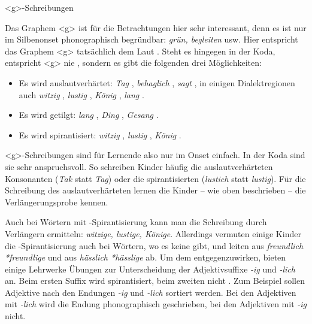\begin{Exkurs}{<g>-Schreibungen}

\largerpage
\noindent Das Graphem <g> ist für die Betrachtungen hier sehr interessant, denn es ist nur im Silbenonset phonographisch begründbar: \textit{grün, begleiten} usw. Hier entspricht das Graphem <g> tatsächlich dem Laut \textipa{[g]}. Steht es hingegen in der Koda, entspricht <g> nie \textipa{[g]}, sondern es gibt die folgenden drei Möglichkeiten: 

\begin{itemize}
    \item Es wird auslautverhärtet: \textit{Tag} \textipa{[ta:k]}, \textit{behaglich} , \textit{sagt} \textipa{[za:kt]}, in einigen Dialektregionen auch \textit{witzig} \textipa{[\textprimstress vI\t{\.*{ts}}Ik]}, \textit{lustig} , \textit{König} , \textit{lang} \textipa{[laNk]}.
    \item Es wird getilgt: \textit{lang} \textipa{[laN]}, \textit{Ding} \textipa{[dIN]}, \textit{Gesang} .
    \item Es wird spirantisiert: \textit{witzig} , \textit{lustig} , \textit{König} .
\end{itemize}

<g>-Schreibungen sind für Lernende also nur im Onset einfach. In der Koda sind sie sehr anspruchsvoll. So schreiben Kinder häufig die auslautverhärteten Konsonanten (\textit{Tak} statt \textit{Tag}) oder die spirantisierten (\textit{lustich} statt \textit{lustig}). Für die Schreibung des auslautverhärteten  lernen die Kinder -- wie oben beschrieben -- die Verlängerungsprobe kennen. 

Auch bei Wörtern mit -Spirantisierung kann man die Schreibung durch Verlängern ermitteln: \textit{witzige, lustige, Könige}. Allerdings vermuten einige Kinder die -Spirantisierung auch bei Wörtern, wo es keine gibt, und leiten aus \textit{freundlich *freundlige} und aus \textit{hässlich *hässlige} ab. Um dem entgegenzuwirken, bieten einige Lehrwerke Übungen zur Unterscheidung der Adjektivsuffixe \textit{-ig} und \textit{-lich} an. Beim ersten Suffix wird spirantisiert, beim zweiten nicht \citep[32/8--32/9]{Lessmann2009}.
Zum Beispiel sollen Adjektive nach den Endungen \textit{-ig} und \textit{-lich} sortiert werden. Bei den Adjektiven mit \textit{-lich} wird die Endung phonographisch geschrieben, bei den Adjektiven mit \textit{-ig} nicht.


\end{Exkurs}
